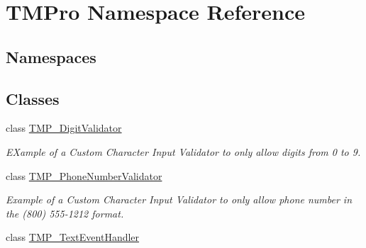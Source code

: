 \hypertarget{namespaceTMPro}{}\section{T\+M\+Pro Namespace Reference}
\label{namespaceTMPro}
\subsection*{Namespaces}
\begin{DoxyCompactItemize}
\end{DoxyCompactItemize}
\subsection*{Classes}
\begin{DoxyCompactItemize}
\item 
class \hyperlink{classTMPro_1_1TMP__DigitValidator}{T\+M\+P\+\_\+\+Digit\+Validator}
\begin{DoxyCompactList}\small\item\em E\+Xample of a Custom Character Input Validator to only allow digits from 0 to 9. \end{DoxyCompactList}\item 
class \hyperlink{classTMPro_1_1TMP__PhoneNumberValidator}{T\+M\+P\+\_\+\+Phone\+Number\+Validator}
\begin{DoxyCompactList}\small\item\em Example of a Custom Character Input Validator to only allow phone number in the (800) 555-\/1212 format. \end{DoxyCompactList}\item 
class \hyperlink{classTMPro_1_1TMP__TextEventHandler}{T\+M\+P\+\_\+\+Text\+Event\+Handler}
\end{DoxyCompactItemize}
